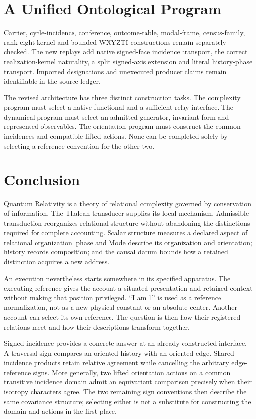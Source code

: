\section{A Unified Ontological Program}
Carrier, cycle-incidence, conference, outcome-table, modal-frame, census-family, rank-eight kernel and bounded WXYZTI constructions remain separately checked. The new replays add native signed-face incidence transport, the correct realization-kernel naturality, a split signed-axis extension and literal history-phase transport. Imported designations and unexecuted producer claims remain identifiable in the source ledger.

The revised architecture has three distinct construction tasks. The complexity program must select a native functional and a sufficient relay interface. The dynamical program must select an admitted generator, invariant form and represented observables. The orientation program must construct the common incidences and compatible lifted actions. None can be completed solely by selecting a reference convention for the other two.

\section{Conclusion}
Quantum Relativity is a theory of relational complexity governed by conservation of information. The Thalean transducer supplies its local mechanism. Admissible transduction reorganizes relational structure without abandoning the distinctions required for complete accounting. Scalar structure measures a declared aspect of relational organization; phase and Mode describe its organization and orientation; history records composition; and the causal datum bounds how a retained distinction acquires a new address.

An execution nevertheless starts somewhere in its specified apparatus. The executing reference gives the account a situated presentation and retained context without making that position privileged. ``I am 1'' is used as a reference normalization, not as a new physical constant or an absolute center. Another account can select its own reference. The question is then how their registered relations meet and how their descriptions transform together.

Signed incidence provides a concrete answer at an already constructed interface. A traversal sign compares an oriented history with an oriented edge. Shared-incidence products retain relative agreement while cancelling the arbitrary edge-reference signs. More generally, two lifted orientation actions on a common transitive incidence domain admit an equivariant comparison precisely when their isotropy characters agree. The two remaining sign conventions then describe the same covariance structure; selecting either is not a substitute for constructing the domain and actions in the first place.

